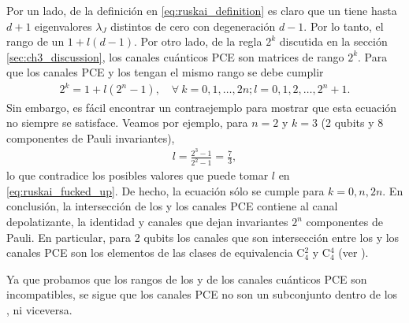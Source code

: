 Por un lado, de la definición en \eqref{eq:ruskai_definition} es claro que un \ruskaiMap{}
tiene hasta $d+1$ eigenvalores $\lambda_J$ distintos de cero 
con degeneración $d-1$. Por lo tanto,
el rango de un \ruskaiMap{} $1+l(d-1)$. Por otro lado, 
de la regla $2^k$ discutida en la sección \ref{sec:ch3_discussion},
los canales cuánticos PCE son matrices de rango $2^k$. Para que los canales PCE
y los \ruskai{} tengan el mismo rango se debe cumplir 
\begin{align}\label{eq:ruskai_fucked_up}
2^k=1+l(2^n-1),\quad \forall \ k=0,1,\ldots,2n; l=0,1,2,\ldots,2^n+1.
\end{align}
Sin embargo, es fácil encontrar un contraejemplo para mostrar que esta
ecuación no siempre se satisface. Veamos por ejemplo, para $n=2$ y $k=3$
(2 qubits y 8 componentes de Pauli invariantes),
\begin{align}
l=\frac{2^3-1}{2^2-1}=\frac{7}{3},
\end{align}
lo que contradice los posibles valores que puede tomar $l$ 
en \eqref{eq:ruskai_fucked_up}. De hecho, la ecuación sólo se cumple 
para $k=0,n,2n$. En conclusión, la intersección de los \ruskai{}
y los canales PCE contiene al canal depolatizante, la identidad y canales 
que dejan invariantes $2^n$ componentes de Pauli. En particular, para 2 qubits 
los canales que son intersección entre los \ruskai{} y los canales PCE son los 
elementos de las clases de equivalencia C${}_4^2$ y C${}_4^4$
(ver ). 

Ya que probamos que los 
rangos de los \ruskai{} y de los canales cuánticos PCE son incompatibles, 
se sigue que los canales PCE no son un subconjunto dentro de los 
\ruskai{}, ni viceversa.




